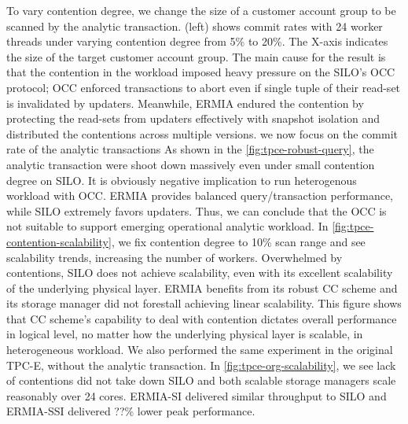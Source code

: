 To vary contention degree, we change the size of a customer account group to be scanned by the analytic transaction. (left) shows commit rates with 24 worker threads under varying contention degree from 5\% to 20\%. The X-axis indicates the size of the target customer account group.  %
The main cause for the result is that the contention in the workload imposed heavy pressure on the SILO's OCC protocol; OCC enforced transactions to abort even if single tuple of their read-set is invalidated by updaters. Meanwhile, ERMIA endured the contention by protecting the read-sets from updaters effectively with snapshot isolation and distributed the contentions across multiple versions. we now focus on the commit rate of the analytic transactions
As shown in the \ref{fig:tpce-robust-query}, the analytic transaction were shoot down massively even under small contention degree on SILO. It is obviously negative implication to run heterogenous workload with OCC. ERMIA provides balanced query/transaction performance, while SILO extremely favors updaters. Thus, we can conclude that the OCC is not suitable to support emerging operational analytic workload. 
In \ref{fig:tpce-contention-scalability}, we fix contention degree to 10\% scan range and see scalability trends, increasing the number of workers. Overwhelmed by contentions, SILO does not achieve scalability, even with its excellent scalability of the underlying physical layer. ERMIA benefits from its robust CC scheme and its storage manager did not forestall achieving linear scalability. This figure shows that CC scheme's capability to deal with contention dictates overall performance in logical level, no matter how the underlying physical layer is scalable, in heterogeneous workload. We also performed the same experiment in the original TPC-E, without the analytic transaction. In \ref{fig:tpce-org-scalability}, we see lack of contentions did not take down SILO and both scalable storage managers scale reasonably over 24 cores. ERMIA-SI delivered similar throughput to SILO and ERMIA-SSI delivered ??\% lower peak performance. 

